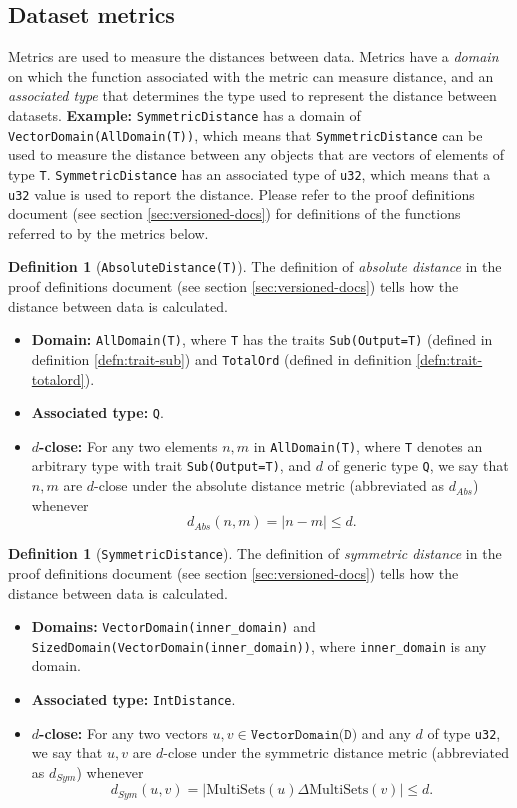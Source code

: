 \documentclass[11pt,a4paper]{article}
\theoremstyle{definition}
\newtheorem{definition}[theorem]{Definition}
\newcommand{\MultiSet}{\mathrm{MultiSets}}
\newcommand{\metricDefn}[1]{The definition of \emph{#1} in the proof definitions document (see section \ref{sec:versioned-docs}) tells how the distance between data is calculated.}
\begin{document}
\subsection{Dataset metrics}
Metrics are used to measure the distances between data. Metrics have a \emph{domain} on which the function associated with the metric can measure distance, and an \emph{associated type} that determines the type used to represent the distance between datasets.
\textbf{Example:} \texttt{SymmetricDistance} has a domain of \texttt{VectorDomain(AllDomain(T))}, which means that \texttt{SymmetricDistance} can be used to measure the distance between any objects that are vectors of elements of type \texttt{T}. \texttt{SymmetricDistance} has an associated type of \texttt{u32}, which means that a \texttt{u32} value is used to report the distance.
Please refer to the proof definitions document (see section \ref{sec:versioned-docs}) for definitions of the functions referred to by the metrics below.
\begin{definition}[\texttt{AbsoluteDistance(T)}]
\metricDefn{absolute distance}
\begin{itemize}
    \item \textbf{Domain:} \texttt{AllDomain(T)}, where \texttt{T} has the traits \texttt{Sub(Output=T)} (defined in definition \ref{defn:trait-sub}) and \texttt{TotalOrd} (defined in definition \ref{defn:trait-totalord}).
    \item \textbf{Associated type:} \texttt{Q}.
    \item \textbf{$d$-close:} For any two elements $n, m$ in \texttt{AllDomain(T)}, where \texttt{T} denotes an arbitrary type with trait \texttt{Sub(Output=T)}, and $d$ of generic type \texttt{Q}, we say that $n, m$ are $d$-close under the absolute distance metric (abbreviated as $d_{Abs}$) whenever
    \[
        d_{Abs}(n, m) = |n-m| \leq d.
    \]
\end{itemize}
\end{definition}
\begin{definition}[\texttt{SymmetricDistance}]
\metricDefn{symmetric distance} 
\begin{itemize}
    \item \textbf{Domains:} \texttt{VectorDomain(inner\_domain)} and \texttt{SizedDomain(VectorDomain(inner\_domain))}, where \texttt{inner\_domain} is any domain.
    
    \item \textbf{Associated type:} \texttt{IntDistance}.
    \item \textbf{$d$-close:} For any two vectors $u, v \in \texttt{VectorDomain(D)}$ and any $d$ of type \texttt{u32}, we say that $u, v$ are $d$-close under the symmetric distance metric (abbreviated as $d_{Sym}$) whenever 
    \[
        d_{Sym}(u, v) = |\MultiSet(u) \Delta \MultiSet(v)| \leq d.
    \]
\end{itemize}
\end{definition}
\end{document}
